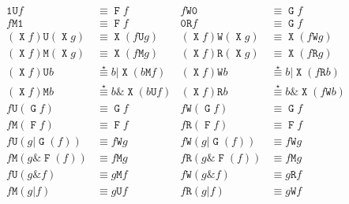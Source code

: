 \documentclass[a4paper,twoside,10pt,DIV=12]{scrreprt}
\DeclareMathOperator{\F}{\texttt{F}}
\DeclareMathOperator{\G}{\texttt{G}}
\newcommand{\U}{\mathbin{\texttt{U}}}
\newcommand{\R}{\mathbin{\texttt{R}}}
\DeclareMathOperator{\X}{\texttt{X}}
\newcommand{\M}{\mathbin{\texttt{M}}}
\newcommand{\W}{\mathbin{\texttt{W}}}
\newcommand{\OR}{\mathbin{\texttt{|}}}
\newcommand{\AND}{\mathbin{\texttt{\&}}}
\newcommand{\0}{\texttt{0}}
\newcommand{\1}{\texttt{1}}
\newcommand{\equiV}{\stackrel{\star}{\equiv}}
\begin{document}
\begin{align*}
  \1 \U f             & \equiv \F f            & f \W \0             & \equiv \G f            \\
  f \M \1             & \equiv \F f            & \0 \R f             & \equiv \G f            \\
  (\X f)\U (\X g)     & \equiv \X(f\U g)       & (\X f)\W(\X g)      & \equiv \X(f\W g)       \\
  (\X f)\M (\X g)     & \equiv \X(f\M g)       & (\X f)\R(\X g)      & \equiv \X(f\R g)       \\
  (\X f)\U b          & \equiV b\OR \X(b\M f)  & (\X f)\W b          & \equiV b\OR \X(f\R b)  \\
  (\X f)\M b          & \equiV b\AND \X(b\U f) & (\X f)\R b          & \equiV b\AND \X(f\W b) \\
  f \U(\G f)          & \equiv \G f            & f \W(\G f)          & \equiv \G f            \\
  f \M(\F f)          & \equiv \F f            & f \R(\F f)          & \equiv \F f            \\
  f \U (g \OR \G(f))  & \equiv f\W g           & f \W (g \OR \G(f))  & \equiv f\W g           \\
  f \M (g \AND \F(f)) & \equiv f\M g           & f \R (g \AND \F(f)) & \equiv f\M g           \\
  f \U (g \AND f)     & \equiv g\M f           & f \W (g \AND f)     & \equiv g\R f           \\
  f \M (g \OR f)      & \equiv g\U f           & f \R (g \OR f)      & \equiv g\W f
\end{align*}
\end{document}
